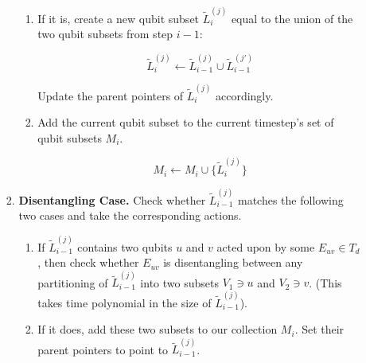 \begin{enumerate}
\begin{enumerate}
\begin{enumerate}
\begin{enumerate}
\item
If it is, create a new qubit subset
$\tilde{L}^{(j)}_{i}$ equal to the union of the two qubit subsets from
step $i-1$:

\begin{equation*}
\tilde{L}^{(j)}_{i} \leftarrow \tilde{L}^{(j)}_{i-1} \cup \tilde{L}^{(j')}_{i-1}
\end{equation*}

Update the parent pointers of $\tilde{L}^{(j)}_{i}$ accordingly.



\item
Add the current qubit subset to the current timestep's set of qubit subsets $M_i$.

\begin{equation*}
M_i \leftarrow M_i \cup \{ \tilde{L}^{(j)}_{i} \}
\end{equation*}

\end{enumerate}

\item \textbf{Disentangling Case.} Check whether $\tilde{L}^{(j)}_{i-1}$ matches the following two cases
and take the corresponding actions.

\begin{enumerate}
\item If $\tilde{L}^{(j)}_{i-1}$ contains two qubits $u$ and $v$
acted upon by some
$E_{uv} \in T_d$, then check whether $E_{uv}$ is
disentangling between any partitioning of $\tilde{L}^{(j)}_{i-1}$ into two
subsets $V_1 \ni u$ and $V_2 \ni v$. (This takes time
polynomial in the size of $\tilde{L}^{(j)}_{i-1}$).

\item
If it does, add these two subsets to our collection $M_i$.
Set their parent pointers to point to $\tilde{L}^{(j)}_{i-1}$.


\end{enumerate}
\end{enumerate}
\end{enumerate}
\end{enumerate}
